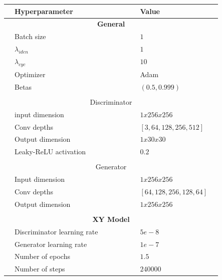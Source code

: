 \documentclass[11pt, fleqn, titlepage]{article}
\newcommand{\1}[1]{\mathds{1}\left[#1\right]}
\begin{document}
\begin{table}[H]
	\centering
	\begin{tabular}{l l l l l l l l l}
		\toprule
		& \textbf{Hyperparameter}     &&&&& & \textbf{Value}   & \\ \midrule
		& \multicolumn{7}{c}{\textbf{General}}              & \\
		& Batch size                  &&&&& & $1$           & \\
		& $\lambda_{iden}$            &&&&& & $1$           & \\
		& $\lambda_{cyc}$             &&&&& & $10$          & \\
		& Optimizer                   &&&&& & Adam          & \\
		& Betas                       &&&&& & $(0.5, 0.999)$& \\
		&                             &&&&& &               & \\
		& \multicolumn{7}{c}{Discriminator}                 & \\
		& input dimension             &&&&& & $1x256x256$   & \\
		& Conv depths                 &&&&& & $\left[3, 64, 128, 256, 512\right]$& \\
		& Output dimension            &&&&& & $1x30x30$     & \\
		& Leaky-ReLU activation       &&&&& & $0.2$         & \\
		&                             &&&&& &               & \\
		& \multicolumn{7}{c}{Generator}                     & \\
		& Input dimension             &&&&& & $1x256x256$   & \\
		& Conv depths                 &&&&& & $\left[64, 128, 256, 128, 64\right]$              & \\
		& Output dimension            &&&&& & $1x256x256$   & \\
		&                             &&&&& &               & \\ 
		& \multicolumn{7}{c}{\textbf{XY Model}}             & \\
		& Discriminator learning rate &&&&& & $5e-8$        & \\
		& Generator learning rate     &&&&& & $1e-7$        & \\
		& Number of epochs            &&&&& & $1.5$         & \\
		& Number of steps             &&&&& & $240000$      & \\

\end{tabular}
\end{table}
\end{document}
